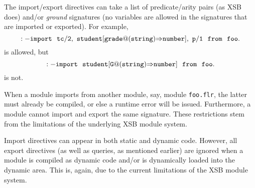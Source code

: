 \documentclass[11pt]{report}
\begin{document}
The import/export directives can take a list of predicate/arity pairs (as
XSB does) and/or \emph{ground} \fl signatures (no variables are allowed in
the signatures that are imported or exported). For example,
\[
\tt
:- import ~~tc/2,~
student[grade@(string){{\Rightarrow}}number],~ p/1~~from~~foo.
\]
is allowed, but 
\[
\tt
:- import ~~student[G@(string){{\Rightarrow}}number]~~from~~foo.
\]
is not.

When a \FLORA module imports from another module, say, module {\tt foo.flr}, 
the latter must already be compiled, or else a runtime error will be
issued. Furthermore, a \FLORA module cannot import and export the same
signature. These restrictions stem from the limitations of the underlying
XSB module system.

Import directives can appear in both static and dynamic code. However, all
export directives (as well as queries, as mentioned earlier) are ignored
when a \FLORA module is compiled as dynamic code and/or is dynamically loaded
into the dynamic area. This is, again, due to the current limitations of
the XSB module system.
\end{document}
